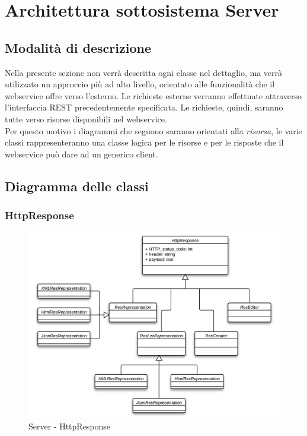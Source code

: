 \section{Architettura sottosistema Server}

\subsection{Modalità di descrizione}
Nella presente sezione non verrà descritta ogni classe nel dettaglio, ma verrà utilizzato un approccio più ad alto livello, orientato alle funzionalità che il webservice offre verso l'esterno.
Le richieste esterne verranno effettuate attraverso l'interfaccia REST precedentemente specificata. Le richieste, quindi, saranno tutte verso risorse disponibili nel webservice. \\
Per questo motivo i diagrammi che seguono saranno orientati alla \emph{risorsa}, le varie classi rappresenteranno una classe logica per le risorse e per le risposte che il webservice può dare ad un generico client.

\subsection{Diagramma delle classi}

\subsubsection{HttpResponse}

\begin{figure}[H]
\centering
\includegraphics[scale=0.55]{images/cap2/Server/HttpResponse.png}
\caption{Server - HttpResponse}
\end{figure}

